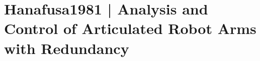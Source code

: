 \section{Hanafusa1981 | Analysis and Control of Articulated Robot Arms with Redundancy}

\cite{hanafusa1981} 

